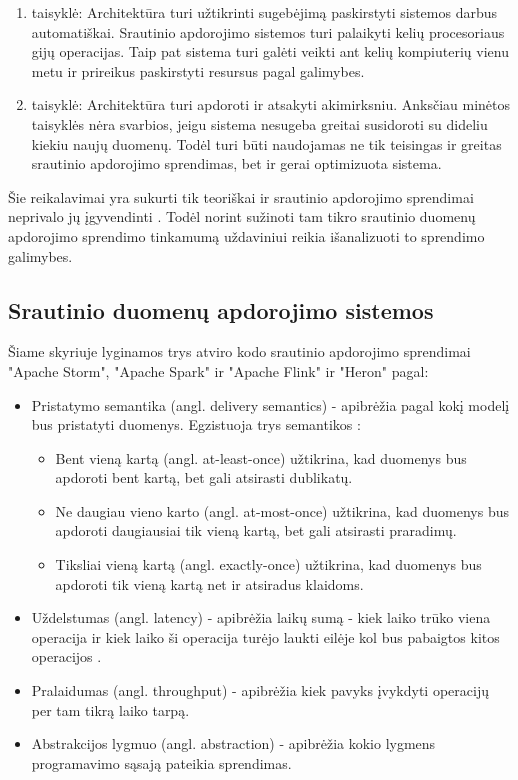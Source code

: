 \documentclass{VUMIFPSbakalaurinis}
\begin{document}
\begin{enumerate}[label=\arabic*]
    \item taisyklė: Architektūra turi užtikrinti sugebėjimą paskirstyti sistemos darbus automatiškai. Srautinio apdorojimo sistemos turi palaikyti kelių procesoriaus gijų operacijas. Taip pat sistema turi galėti 
    veikti ant kelių kompiuterių vienu metu ir prireikus paskirstyti resursus pagal galimybes.
    \item taisyklė: Architektūra turi apdoroti ir atsakyti akimirksniu. Anksčiau minėtos taisyklės nėra svarbios, jeigu sistema nesugeba greitai susidoroti su dideliu kiekiu naujų duomenų. 
    Todėl turi būti naudojamas ne tik teisingas ir greitas srautinio apdorojimo sprendimas, bet ir gerai optimizuota sistema.
\end{enumerate}\par 
Šie reikalavimai yra sukurti tik teoriškai ir srautinio apdorojimo sprendimai neprivalo jų įgyvendinti \cite{stonebraker20058}. 
Todėl norint sužinoti tam tikro srautinio duomenų apdorojimo sprendimo tinkamumą uždaviniui reikia išanalizuoti to sprendimo galimybes.   

\subsection{Srautinio duomenų apdorojimo sistemos}

Šiame skyriuje lyginamos trys atviro kodo srautinio apdorojimo sprendimai "Apache Storm", "Apache Spark" ir "Apache Flink" ir "Heron" pagal:
\begin{itemize}
    \item Pristatymo semantika (angl. delivery semantics) - apibrėžia pagal kokį modelį bus pristatyti duomenys. Egzistuoja trys semantikos \cite{ensar20}: 
    \begin{itemize}
        \item Bent vieną kartą (angl. at-least-once) užtikrina, kad duomenys bus apdoroti bent kartą, bet gali atsirasti dublikatų. 
        \item Ne daugiau vieno karto (angl. at-most-once) užtikrina, kad duomenys bus apdoroti daugiausiai tik vieną kartą, bet gali atsirasti praradimų. 
        \item Tiksliai vieną kartą (angl. exactly-once) užtikrina, kad duomenys bus apdoroti tik vieną kartą net ir atsiradus klaidoms.
    \end{itemize}
    \item Uždelstumas (angl. latency) - apibrėžia laikų sumą - kiek laiko trūko viena operacija ir kiek laiko ši operacija turėjo laukti eilėje kol bus pabaigtos kitos operacijos \cite{karimov2018benchmarking}.
    \item Pralaidumas (angl. throughput) - apibrėžia kiek pavyks įvykdyti operacijų per tam tikrą laiko tarpą.
    \item Abstrakcijos lygmuo (angl. abstraction) - apibrėžia kokio lygmens programavimo sąsają pateikia sprendimas.
\end{itemize}
\end{document}
